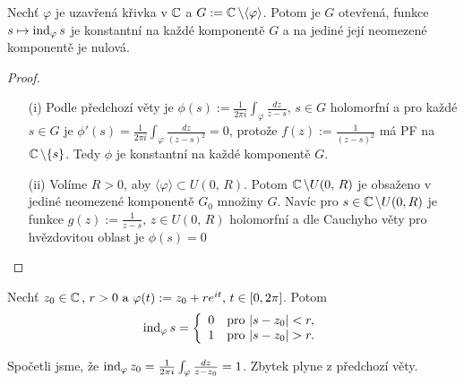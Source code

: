 \begin{theorem}
 Nechť $\varphi$ je uzavřená křivka v $\operatorname{\mathbb{C}}  $ a $G:=\operatorname{\mathbb{C}}  \backslash\langle\varphi\rangle$. %
Potom je $G$ otevřená, funkce $s\mapsto \operatorname{ind}_{\varphi} s$ je konstantní na každé komponentě $G$ a na jediné její neomezené komponentě je nulová. 
\end{theorem}
\begin{proof}
\begin{itemize}
    \item[(i)] Podle předchozí věty je $\phi(s):=\frac{1}{2\pi i}\int_{\varphi}\frac{dz}{z-s}\text{, }s\in G$  %
    holomorfní a pro každé $s\in G$ je $\phi'(s)=\frac{1}{2\pi i}\int_{\varphi}\frac{dz}{(z-s)^2}=0$, protože $f(z):=\frac{1}{(z-s)^2}$ má PF na $\operatorname{\mathbb{C}}  \backslash\{s\}$. %
    Tedy $\phi$ je konstantní na každé komponentě $G$.
    \item[(ii)]%
    Volíme $R>0$, aby $\langle\varphi\rangle\subset U(0,\, R)$. Potom $\operatorname{\mathbb{C}}  \backslash U(0,\, R)$ je obsaženo v jediné neomezené komponentě $G_{0}$ množiny $G$. Navíc pro $s\in\operatorname{\mathbb{C}}  \backslash U(0,R)$ je funkce $g(z):=\frac{1}{z-s}\text{, }z\in U(0,\, R)$ holomorfní a dle Cauchyho věty pro hvězdovitou oblast %
    je $\phi(s)=0$
\end{itemize}

\end{proof}

\begin{example}
Nechť $z_{0}\in\operatorname{\mathbb{C}}  \text{, }r>0\text{ a }\varphi(t):=z_{0}+r e^{it}\text{, }t\in [0,2\pi]$. %
Potom $$\ind_{\varphi}s=
\twopartdef
{0}{|s-z_{0}|<r,}  %
{1}{|s-z_{0}|>r.}$$ %

Spočetli jsme, že
$\operatorname{ind}_{\varphi}z_{0}=\frac{1}{2\pi i}\int_{\varphi}\frac{dz}{z-z_{0}}=1$.
Zbytek plyne z předchozí věty.
\end{example}
